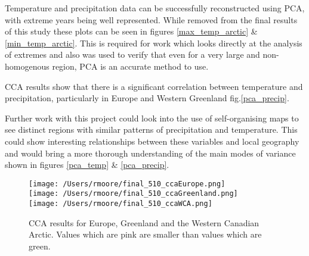 \documentclass[11pt, oneside]{article}
\begin{document}
Temperature and precipitation data can be successfully reconstructed using PCA, with extreme years being well represented. While removed from the final results of this study these plots can be seen in figures \ref{max_temp_arctic} \&\ref{min_temp_arctic}. This is required for work which looks directly at the analysis of extremes and also was used to verify that even for a very large and non-homogenous region, PCA is an accurate method to use.
 
CCA results show that there is a significant correlation between temperature and precipitation, particularly in Europe and Western Greenland fig.\ref{pca_precip}.
 
Further work with this project could look into the use of self-organising maps to see distinct regions with similar patterns of precipitation and temperature. This could show interesting relationships between these variables and local geography and would bring a more thorough understanding of the main modes of variance shown in figures \ref{pca_temp} \& \ref{pca_precip}.


\newpage
\pagebreak 
\newpage







\begin{figure}[!h!tb]
  \centering
    \texttt{[image: /Users/rmoore/final\_510\_ccaEurope.png]}
  \endminipage 
  \\
    \texttt{[image: /Users/rmoore/final\_510\_ccaGreenland.png]}
  \endminipage
  \\
    \texttt{[image: /Users/rmoore/final\_510\_ccaWCA.png]}
  \endminipage
  \caption{CCA results for Europe, Greenland and the Western Canadian Arctic. Values which are pink are smaller than values which are green.}\label{cca}
  \end{figure}






  \newpage
  \pagebreak
  \newpage
  \clearpage
  



  \pagebreak[4]




 {}

\end{document}
